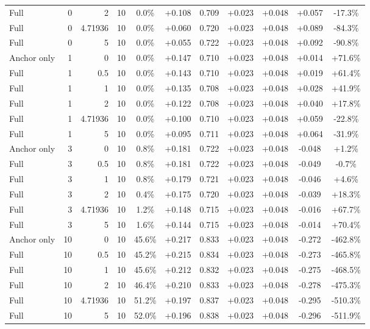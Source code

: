\begin{table}[htbp]
\begin{tabular}{lrrrccccccc}
Full & 0 & 2 & 10 & 0.0\% & +0.108 & 0.709 & +0.023 & +0.048 & +0.057 & -17.3\% \\
Full & 0 & 4.71936 & 10 & 0.0\% & +0.060 & 0.720 & +0.023 & +0.048 & +0.089 & -84.3\% \\
Full & 0 & 5 & 10 & 0.0\% & +0.055 & 0.722 & +0.023 & +0.048 & +0.092 & -90.8\% \\
Anchor only & 1 & 0 & 10 & 0.0\% & +0.147 & 0.710 & +0.023 & +0.048 & +0.014 & +71.6\% \\
Full & 1 & 0.5 & 10 & 0.0\% & +0.143 & 0.710 & +0.023 & +0.048 & +0.019 & +61.4\% \\
Full & 1 & 1 & 10 & 0.0\% & +0.135 & 0.708 & +0.023 & +0.048 & +0.028 & +41.9\% \\
Full & 1 & 2 & 10 & 0.0\% & +0.122 & 0.708 & +0.023 & +0.048 & +0.040 & +17.8\% \\
Full & 1 & 4.71936 & 10 & 0.0\% & +0.100 & 0.710 & +0.023 & +0.048 & +0.059 & -22.8\% \\
Full & 1 & 5 & 10 & 0.0\% & +0.095 & 0.711 & +0.023 & +0.048 & +0.064 & -31.9\% \\
Anchor only & 3 & 0 & 10 & 0.8\% & +0.181 & 0.722 & +0.023 & +0.048 & -0.048 & +1.2\% \\
Full & 3 & 0.5 & 10 & 0.8\% & +0.181 & 0.722 & +0.023 & +0.048 & -0.049 & -0.7\% \\
Full & 3 & 1 & 10 & 0.8\% & +0.179 & 0.721 & +0.023 & +0.048 & -0.046 & +4.6\% \\
Full & 3 & 2 & 10 & 0.4\% & +0.175 & 0.720 & +0.023 & +0.048 & -0.039 & +18.3\% \\
Full & 3 & 4.71936 & 10 & 1.2\% & +0.148 & 0.715 & +0.023 & +0.048 & -0.016 & +67.7\% \\
Full & 3 & 5 & 10 & 1.6\% & +0.144 & 0.715 & +0.023 & +0.048 & -0.014 & +70.4\% \\
Anchor only & 10 & 0 & 10 & 45.6\% & +0.217 & 0.833 & +0.023 & +0.048 & -0.272 & -462.8\% \\
Full & 10 & 0.5 & 10 & 45.2\% & +0.215 & 0.834 & +0.023 & +0.048 & -0.273 & -465.8\% \\
Full & 10 & 1 & 10 & 45.6\% & +0.212 & 0.832 & +0.023 & +0.048 & -0.275 & -468.5\% \\
Full & 10 & 2 & 10 & 46.4\% & +0.210 & 0.833 & +0.023 & +0.048 & -0.278 & -475.3\% \\
Full & 10 & 4.71936 & 10 & 51.2\% & +0.197 & 0.837 & +0.023 & +0.048 & -0.295 & -510.3\% \\
Full & 10 & 5 & 10 & 52.0\% & +0.196 & 0.838 & +0.023 & +0.048 & -0.296 & -511.9\% \\

\end{tabular}
\end{table}
